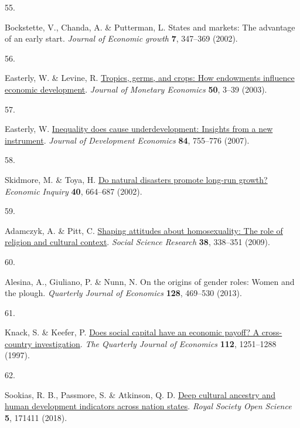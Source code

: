 \documentclass[
  man,floatsintext]{apa6}
\newlength{\cslhangindent}
\newlength{\csllabelwidth}
\newlength{\cslentryspacingunit} %
\newenvironment{CSLReferences}[2] %
 {%
  \setlength{\parindent}{0pt}
  \ifodd #1
  \let\oldpar\par
  \def\par{\hangindent=\cslhangindent\oldpar}
  \fi
  \setlength{\parskip}{#2\cslentryspacingunit}
 }%
 {}
\newcommand{\CSLLeftMargin}[1]{\parbox[t]{\csllabelwidth}{#1}}
\newcommand{\CSLRightInline}[1]{\parbox[t]{\linewidth - \csllabelwidth}{#1}\break}
\begin{document}
\begin{CSLReferences}{0}{0}
\leavevmode{}%
\CSLLeftMargin{55. }%
\CSLRightInline{Bockstette, V., Chanda, A. \& Putterman, L. States and markets: The advantage of an early start. \emph{Journal of Economic growth} \textbf{7}, 347--369 (2002).}

\leavevmode{}%
\CSLLeftMargin{56. }%
\CSLRightInline{Easterly, W. \& Levine, R. \href{https://doi.org/10.1016/S0304-3932(02)00200-3}{Tropics, germs, and crops: How endowments influence economic development}. \emph{Journal of Monetary Economics} \textbf{50}, 3--39 (2003).}

\leavevmode{}%
\CSLLeftMargin{57. }%
\CSLRightInline{Easterly, W. \href{https://doi.org/10.1016/j.jdeveco.2006.11.002}{Inequality does cause underdevelopment: Insights from a new instrument}. \emph{Journal of Development Economics} \textbf{84}, 755--776 (2007).}

\leavevmode{}%
\CSLLeftMargin{58. }%
\CSLRightInline{Skidmore, M. \& Toya, H. \href{https://doi.org/10.1093/ei/40.4.664}{Do natural disasters promote long-run growth?} \emph{Economic Inquiry} \textbf{40}, 664--687 (2002).}

\leavevmode{}%
\CSLLeftMargin{59. }%
\CSLRightInline{Adamczyk, A. \& Pitt, C. \href{https://doi.org/10.1016/j.ssresearch.2009.01.002}{Shaping attitudes about homosexuality: The role of religion and cultural context}. \emph{Social Science Research} \textbf{38}, 338--351 (2009).}

\leavevmode{}%
\CSLLeftMargin{60. }%
\CSLRightInline{Alesina, A., Giuliano, P. \& Nunn, N. On the origins of gender roles: Women and the plough. \emph{Quarterly Journal of Economics} \textbf{128}, 469--530 (2013).}

\leavevmode{}%
\CSLLeftMargin{61. }%
\CSLRightInline{Knack, S. \& Keefer, P. \href{https://doi.org/10.1162/003355300555475}{Does social capital have an economic payoff? A cross-country investigation}. \emph{The Quarterly Journal of Economics} \textbf{112}, 1251--1288 (1997).}

\leavevmode{}%
\CSLLeftMargin{62. }%
\CSLRightInline{Sookias, R. B., Passmore, S. \& Atkinson, Q. D. \href{https://doi.org/10.1098/rsos.171411}{Deep cultural ancestry and human development indicators across nation states}. \emph{Royal Society Open Science} \textbf{5}, 171411 (2018).}


\end{CSLReferences}
\end{document}
